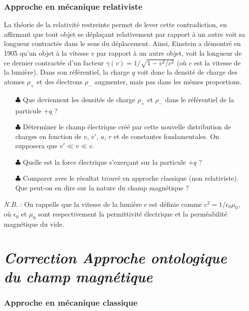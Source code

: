 \documentclass{report}
\begin{document}
\subsubsection*{Approche en mécanique relativiste}

La théorie de la relativité restreinte permet de lever cette contradiction, en affirmant que tout objet se déplaçant relativement par rapport à un autre voit sa longueur contractée dans le sens du déplacement. Ainsi, Einstein a démontré en 1905 qu'un objet à la vitesse $v$ par rapport à un autre objet, voit la longueur de ce dernier contractée d'un facteur $\gamma(v)=1/\sqrt{1-v^{2}/c^{2}}$ (où $c$ est la vitesse de la lumière). Dans son référentiel, la charge $q$ voit donc la densité de charge des atomes $\rho_+$ et des électrons $\rho_-$ augmenter, mais pas dans les mêmes proportions. 
	\begin{itemize}
		\item[$\clubsuit$] Que deviennent les densités de charge $\rho_{+}$ et $\rho_{-}$ dans le référentiel de la particule $+q$ ? %
		\item[$\clubsuit$] Déterminer le champ électrique créé par cette nouvelle distribution de charges en fonction de $v$, $v'$, $a$, $r$ et de constantes fondamentales. On supposera que $v'\ll v\ll c$.
		\item[$\clubsuit$] Quelle est la force électrique s'exerçant sur la particule $+q$ ? 
		\item[$\clubsuit$] Comparer avec le résultat trouvé en approche classique (non relativiste). Que peut-on en dire sur la nature du champ magnétique ?
	\end{itemize}
			
\textit{N.B.} : On rappelle que la vitesse de la lumière $c$ est définie comme $c^{2}=1/\epsilon_{0}\mu_{0}$, où $\epsilon_{0}$ et $\mu_{0}$ sont respectivement la permittivité électrique et la perméabilité magnétique du vide.

\newpage

\section*{\textit{Correction Approche ontologique du champ magnétique}}

\subsubsection*{Approche en mécanique classique}
\end{document}
